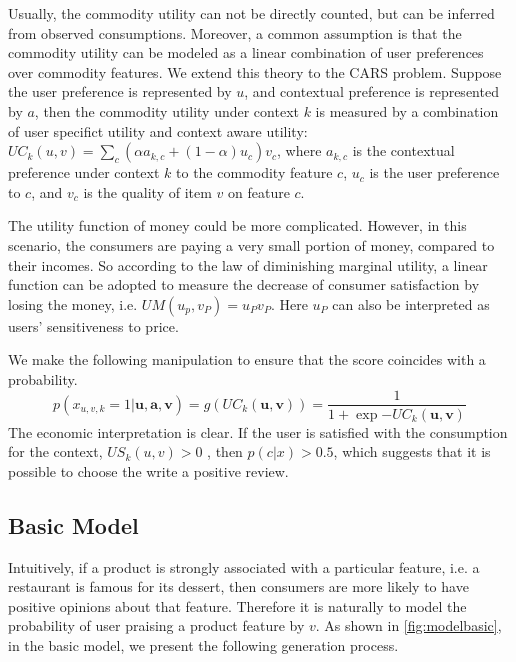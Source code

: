 \documentclass[sigconf]{acmart}
\begin{document}
Usually, the commodity utility can not be directly counted, but can be inferred from observed consumptions. Moreover, a common assumption is that the commodity utility can be modeled as a linear combination of user preferences over commodity features. We extend this theory to the CARS problem. Suppose the user preference is represented by $u$, and contextual preference is represented by $a$, then the commodity utility under context $k$ is measured by a combination of user specifict utility and context aware utility: $UC_k(u,v)= \sum_c (\alpha a_{k,c} + (1-\alpha) u_c) v_c$, where $a_{k,c}$ is the contextual preference under context $k$ to the commodity feature $c$, $u_c$ is the user preference to $c$, and $v_c$ is the quality of item $v$ on feature $c$.

The utility function of money could be more complicated. However, in this scenario, the consumers are paying a very small portion of money, compared to their incomes. So according to the law of diminishing marginal utility, a linear function can be adopted to measure the decrease of consumer satisfaction by losing the money, i.e. $UM(u_p,v_P)=u_P v_P$. Here $u_P$ can also be interpreted as users' sensitiveness to price.


We make the following manipulation to ensure that the score coincides with a probability. 
\begin{equation}\label{equ:pcx}
  p(x_{u,v,k}=1|\mathbf{u,a,v})=g(UC_k(\mathbf{u,v}))=\frac{1}{1+\exp{-UC_k(\mathbf{u,v})}}
\end{equation}
The economic interpretation is clear. If the user is satisfied with the consumption for the context, $US_k(u,v)>0$ , then $p(c|x)>0.5$, which suggests that it is possible to choose the write a positive review.

\subsection{Basic Model}

Intuitively,  if a product is strongly associated with a particular feature, i.e. a restaurant is famous for its dessert, then consumers are more likely to have positive opinions about that feature. Therefore it is naturally to model the probability of user praising a product feature by $v$. As shown in \ref{fig:modelbasic}, in the basic model, we present the following generation process.
\end{document}
